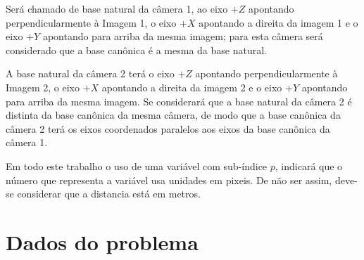 \documentclass[a4paper,10pt]{article}
\begin{document}
Será chamado de base natural da câmera 1, ao eixo $+Z$
apontando perpendicularmente à Imagem 1, o eixo $+X$ apontando a direita da imagem 1 e o eixo $+Y$
apontando para arriba da mesma imagem; para esta câmera será considerado que a base canônica é a mesma da base natural. 

A base natural da câmera 2 terá o eixo $+Z$ apontando perpendicularmente à Imagem 2, 
o eixo $+X$ apontando a direita da imagem 2 e o eixo $+Y$
apontando para arriba da mesma imagem. 
Se considerará que a base natural da câmera 2 é distinta da  base canônica da mesma câmera, de modo que a base canônica da câmera 2 terá os eixos coordenados 
paralelos aos eixos da base canônica da câmera 1.

Em todo este trabalho o uso de uma variável com sub-índice $p$, indicará que o número
que representa a variável usa unidades em pixeis.
De não ser assim, deve-se considerar que a distancia está em metros.

\section{Dados do problema}
\end{document}

